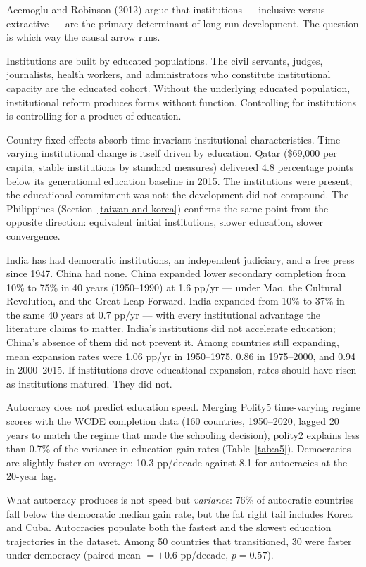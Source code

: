\documentclass[12pt,letterpaper]{article}
\begin{document}
{Acemoglu and Robinson (2012) argue that institutions --- inclusive versus extractive --- are the primary determinant of long-run development. The question is which way the causal arrow runs.

Institutions are built by educated populations. The civil servants, judges, journalists, health workers, and administrators who constitute institutional capacity are the educated cohort. Without the underlying educated population, institutional reform produces forms without function. Controlling for institutions is controlling for a product of education.

Country fixed effects absorb time-invariant institutional characteristics. Time-varying institutional change is itself driven by education. Qatar (\$69,000 per capita, stable institutions by standard measures) delivered 4.8 percentage points below its generational education baseline in 2015. The institutions were present; the educational commitment was not; the development did not compound. The Philippines (Section~\ref{taiwan-and-korea}) confirms the same point from the opposite direction: equivalent initial institutions, slower education, slower convergence.

India has had democratic institutions, an independent judiciary, and a free press since 1947. China had none. China expanded lower secondary completion from 10\% to 75\% in 40 years (1950--1990) at 1.6 pp/yr --- under Mao, the Cultural Revolution, and the Great Leap Forward. India expanded from 10\% to 37\% in the same 40 years at 0.7 pp/yr --- with every institutional advantage the literature claims to matter. India's institutions did not accelerate education; China's absence of them did not prevent it. Among countries still expanding, mean expansion rates were 1.06 pp/yr in 1950--1975, 0.86 in 1975--2000, and 0.94 in 2000--2015. If institutions drove educational expansion, rates should have risen as institutions matured. They did not.

Autocracy does not predict education speed. Merging Polity5 time-varying regime scores with the WCDE completion data (160 countries, 1950--2020, lagged 20 years to match the regime that made the schooling decision), polity2 explains less than 0.7\% of the variance in education gain rates (Table~\ref{tab:a5}). Democracies are slightly faster on average: 10.3 pp/decade against 8.1 for autocracies at the 20-year lag.

What autocracy produces is not speed but \emph{variance}: 76\% of autocratic countries fall below the democratic median gain rate, but the fat right tail includes Korea and Cuba. Autocracies populate both the fastest and the slowest education trajectories in the dataset. Among 50 countries that transitioned, 30 were faster under democracy (paired mean $= +0.6$ pp/decade, $p = 0.57$).

}
\end{document}
